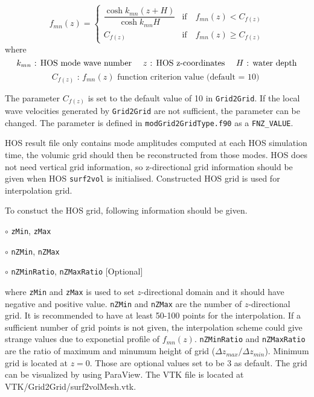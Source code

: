 \vspace{1em}
{
	\begin{equation}
	\label{eq:fnzCriterion}
	f_{mn}(z) = \begin{cases}
	\dfrac{\cosh k_{mn}(z+H)}{\cosh k_{mn}H}  &  \text{if} \quad f_{mn}(z) < C_{f(z)} \\
	C_{f(z)}  &  \text{if} \quad f_{mn}(z) \geq C_{f(z)}
	\end{cases}
	\end{equation}
	\newline
	\centering
	where
	\begin{equation*}
	k_{mn}	\text{ : HOS mode wave number \quad  $z$ : HOS z-coordinates \quad $H$ :  water depth}
	\end{equation*} 
	\begin{equation*}
	C_{f(z)}  \text{ : $f_{mn}(z)$ function criterion value (default = 10) }
	\end{equation*}
}

The parameter $C_{f(z)}$ is set to the default value of  10 in \texttt{Grid2Grid}. If the local wave velocities generated by \texttt{Grid2Grid} are not sufficient, the parameter can be changed. The parameter is defined in \texttt{modGrid2GridType.f90} as a \texttt{FNZ\_VALUE}.

HOS result file only contains mode amplitudes computed at each HOS simulation time, the volumic grid should then be reconstructed from those modes. HOS does not need vertical grid information, so z-directional grid information should be given when HOS \texttt{surf2vol} is initialised. Constructed HOS grid is used for interpolation grid. 

To constuct the HOS grid, following information should be given.

\vspace*{0.5em}
\hspace{0.5 cm} $\circ$ \texttt{zMin}, \texttt{zMax}

\hspace{0.5 cm} $\circ$ \texttt{nZMin}, \texttt{nZMax}

\hspace{0.5 cm} $\circ$ \texttt{nZMinRatio}, \texttt{nZMaxRatio} [Optional]

\pagebreak

where \texttt{zMin} and \texttt{zMax} is used to set $z$-directional domain and it should have negative and positive value. \texttt{nZMin} and \texttt{nZMax} are the number of $z$-directional grid. It is recommended to have at least 50-100 points for the interpolation. If a sufficient number of grid points is not given, the interpolation scheme could give strange values due to exponetial profile of $f_{mn}(z)$. \texttt{nZMinRatio} and \texttt{nZMaxRatio} are the ratio of maximum and minumum height of grid (${\Delta z_{max}}/{\Delta z_{min}} $). Minimum grid is located at $z=0$. Those are optional values set to be 3 as default.  The grid can be visualized by using ParaView. The VTK file is located at VTK/Grid2Grid/surf2volMesh.vtk.

